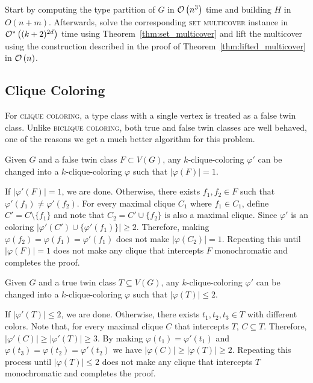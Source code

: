 \begin{tproof}
        Start by computing the type partition of $G$ in $\mathcal{O}\left(n^3\right)$ time and building $H$ in $O(n + m)$.
        Afterwards, solve the corresponding \textsc{set multicover} instance in $\mathcal{O}^*\left((k+2)^{2d}\right)$ time using Theorem~\ref{thm:set_multicover} and lift the multicover using the construction described in the proof of Theorem~\ref{thm:lifted_multicover} in $\mathcal{O}\left(n\right)$.
\end{tproof}

\subsection{Clique Coloring}

For \textsc{clique coloring}, a type class with a single vertex is treated as a false twin class.
Unlike \textsc{biclique coloring}, both true and false twin classes are well behaved, one of the reasons we get a much better algorithm for this problem.


\begin{lemma}
    \label{lem:clique_false_twins}
    Given $G$ and a false twin class $F \subset V(G)$, any  $k$-clique-coloring $\varphi'$ can be changed into a $k$-clique-coloring $\varphi$ such that $|\varphi(F)| = 1$.
\end{lemma}

    \begin{tproof}
    If $|\varphi'(F)| = 1$, we are done.
    Otherwise, there exists $f_1, f_2 \in F$ such that $\varphi'(f_1) \neq \varphi'(f_2)$.
    For every maximal clique $C_1$ where $f_1 \in C_1$, define $C' = C \setminus \{f_1\}$ and note that $C_2 = C' \cup \{f_2\}$ is also a maximal clique.
    Since $\varphi'$ is an  coloring $|\varphi'(C') \cup \{\varphi'(f_1)\}| \geq 2$.
    Therefore, making $\varphi(f_2) = \varphi(f_1) = \varphi'(f_1)$ does not make $|\varphi(C_2)| = 1$. 
    Repeating this until $|\varphi(F)| = 1$ does not make any clique that intercepts $F$ monochromatic and completes the proof.
    \end{tproof}
    
\begin{lemma}
    \label{lem:clique_true_twins}
    Given $G$ and  a true twin class $T \subseteq V(G)$, any  $k$-clique-coloring $\varphi'$ can be changed into a $k$-clique-coloring $\varphi$ such that $|\varphi(T)| \leq 2$.
\end{lemma}

\begin{tproof}
    If $|\varphi'(T)| \leq 2$, we are done.
    Otherwise, there exists $t_1, t_2, t_3 \in T$ with different colors.
    Note that, for every maximal clique $C$ that intercepts $T$, $C \subseteq T$.
    Therefore, $|\varphi'(C)| \geq |\varphi'(T)| \geq 3$.
    By making $\varphi(t_1) = \varphi'(t_1)$ and $\varphi(t_3) = \varphi(t_2) = \varphi'(t_2)$ we have $|\varphi(C)| \geq |\varphi(T)| \geq 2$.
    Repeating this process until $|\varphi(T)| \leq 2$ does not make any clique that intercepts $T$ monochromatic and completes the proof.
\end{tproof}

